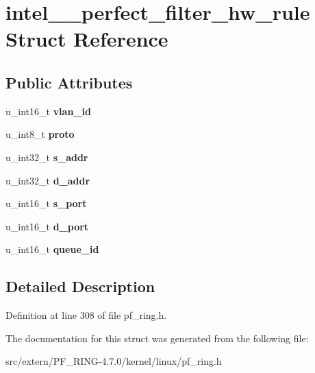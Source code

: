 \hypertarget{structintel__82599__perfect__filter__hw__rule}{
\section{intel\_\_\-perfect\_\-filter\_\-hw\_\-rule Struct Reference}
\label{structintel__82599__perfect__filter__hw__rule}
}
\subsection*{Public Attributes}
\begin{DoxyCompactItemize}
\item 
\hypertarget{structintel__82599__perfect__filter__hw__rule_a4d5b81ab4f834a46b9650341b5d99dce}{
u\_\-int16\_\-t {\bfseries vlan\_\-id}}
\label{structintel__82599__perfect__filter__hw__rule_a4d5b81ab4f834a46b9650341b5d99dce}

\item 
\hypertarget{structintel__82599__perfect__filter__hw__rule_a46e961946ee66062a1c64e320cc8a053}{
u\_\-int8\_\-t {\bfseries proto}}
\label{structintel__82599__perfect__filter__hw__rule_a46e961946ee66062a1c64e320cc8a053}

\item 
\hypertarget{structintel__82599__perfect__filter__hw__rule_ae22c3e9ffbbaa945456e605e5d42288a}{
u\_\-int32\_\-t {\bfseries s\_\-addr}}
\label{structintel__82599__perfect__filter__hw__rule_ae22c3e9ffbbaa945456e605e5d42288a}

\item 
\hypertarget{structintel__82599__perfect__filter__hw__rule_a09aa0d69899d2dcd8e97fc1ae85aff2b}{
u\_\-int32\_\-t {\bfseries d\_\-addr}}
\label{structintel__82599__perfect__filter__hw__rule_a09aa0d69899d2dcd8e97fc1ae85aff2b}

\item 
\hypertarget{structintel__82599__perfect__filter__hw__rule_a3731a2a1c9e8644774c8ee09fbeadc0e}{
u\_\-int16\_\-t {\bfseries s\_\-port}}
\label{structintel__82599__perfect__filter__hw__rule_a3731a2a1c9e8644774c8ee09fbeadc0e}

\item 
\hypertarget{structintel__82599__perfect__filter__hw__rule_a88b1f7fdeccc8fd9dc0396fb1e3dce57}{
u\_\-int16\_\-t {\bfseries d\_\-port}}
\label{structintel__82599__perfect__filter__hw__rule_a88b1f7fdeccc8fd9dc0396fb1e3dce57}

\item 
\hypertarget{structintel__82599__perfect__filter__hw__rule_a709e78c580207194680a8b86c1940dd0}{
u\_\-int16\_\-t {\bfseries queue\_\-id}}
\label{structintel__82599__perfect__filter__hw__rule_a709e78c580207194680a8b86c1940dd0}

\end{DoxyCompactItemize}


\subsection{Detailed Description}


Definition at line 308 of file pf\_\-ring.h.



The documentation for this struct was generated from the following file:\begin{DoxyCompactItemize}
\item 
src/extern/PF\_\-RING-\/4.7.0/kernel/linux/pf\_\-ring.h\end{DoxyCompactItemize}
